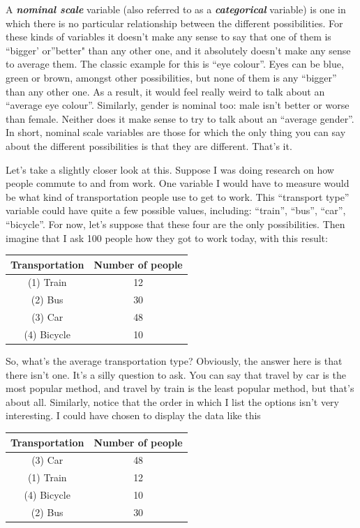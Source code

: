 \documentclass[
]{book}
\begin{document}
A \textbf{\emph{nominal scale}} variable (also referred to as a \textbf{\emph{categorical}} variable) is one in which there is no particular relationship between the different possibilities. For these kinds of variables it doesn't make any sense to say that one of them is ``bigger' or''better" than any other one, and it absolutely doesn't make any sense to average them. The classic example for this is ``eye colour''. Eyes can be blue, green or brown, amongst other possibilities, but none of them is any ``bigger'' than any other one. As a result, it would feel really weird to talk about an ``average eye colour''. Similarly, gender is nominal too: male isn't better or worse than female. Neither does it make sense to try to talk about an ``average gender''. In short, nominal scale variables are those for which the only thing you can say about the different possibilities is that they are different. That's it.

Let's take a slightly closer look at this. Suppose I was doing research on how people commute to and from work. One variable I would have to measure would be what kind of transportation people use to get to work. This ``transport type'' variable could have quite a few possible values, including: ``train'', ``bus'', ``car'', ``bicycle''. For now, let's suppose that these four are the only possibilities. Then imagine that I ask 100 people how they got to work today, with this result:

\begin{longtable}[]{@{}cc@{}}
\toprule
Transportation & Number of people \\
\midrule
\endhead
(1) Train & 12 \\
(2) Bus & 30 \\
(3) Car & 48 \\
(4) Bicycle & 10 \\
\bottomrule
\end{longtable}

So, what's the average transportation type? Obviously, the answer here is that there isn't one. It's a silly question to ask. You can say that travel by car is the most popular method, and travel by train is the least popular method, but that's about all. Similarly, notice that the order in which I list the options isn't very interesting. I could have chosen to display the data like this

\begin{longtable}[]{@{}cc@{}}
\toprule
Transportation & Number of people \\
\midrule
\endhead
(3) Car & 48 \\
(1) Train & 12 \\
(4) Bicycle & 10 \\
(2) Bus & 30 \\
\bottomrule
\end{longtable}
\end{document}
